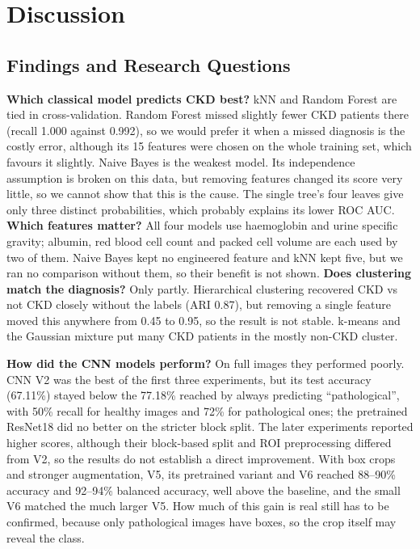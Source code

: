 
\section{Discussion}

\subsection{Findings and Research Questions}
\textbf{Which classical model predicts CKD best?} kNN and Random Forest are tied in cross-validation. Random Forest missed slightly fewer CKD patients there (recall 1.000 against 0.992), so we would prefer it when a missed diagnosis is the costly error, although its 15 features were chosen on the whole training set, which favours it slightly. Naive Bayes is the weakest model. Its independence assumption is broken on this data, but removing features changed its score very little, so we cannot show that this is the cause. The single tree's four leaves give only three distinct probabilities, which probably explains its lower ROC AUC. \textbf{Which features matter?} All four models use haemoglobin and urine specific gravity; albumin, red blood cell count and packed cell volume are each used by two of them. Naive Bayes kept no engineered feature and kNN kept five, but we ran no comparison without them, so their benefit is not shown. \textbf{Does clustering match the diagnosis?} Only partly. Hierarchical clustering recovered CKD vs not CKD closely without the labels (ARI 0.87), but removing a single feature moved this anywhere from 0.45 to 0.95, so the result is not stable. k-means and the Gaussian mixture put many CKD patients in the mostly non-CKD cluster.

\textbf{How did the CNN models perform?} On full images they performed poorly. CNN V2 was the best of the first three experiments, but its test accuracy (67.11\%) stayed below the 77.18\% reached by always predicting ``pathological'', with 50\% recall for healthy images and 72\% for pathological ones; the pretrained ResNet18 did no better on the stricter block split. The later experiments reported higher scores, although their block-based split and ROI preprocessing differed from V2, so the results do not establish a direct improvement. With box crops and stronger augmentation, V5, its pretrained variant and V6 reached 88--90\% accuracy and 92--94\% balanced accuracy, well above the baseline, and the small V6 matched the much larger V5. How much of this gain is real still has to be confirmed, because only pathological images have boxes, so the crop itself may reveal the class.

